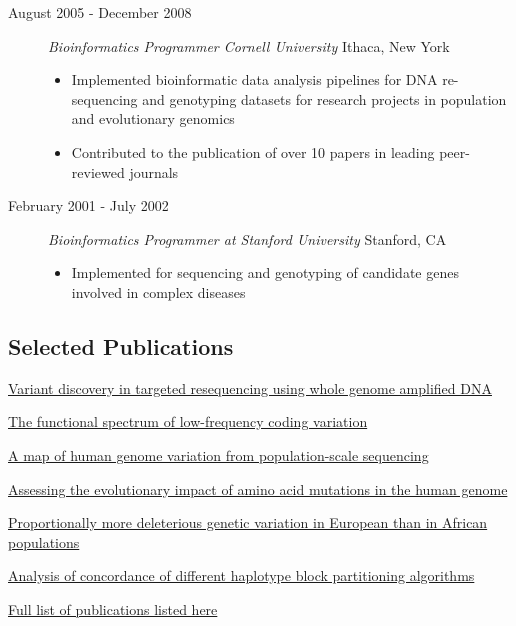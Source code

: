 \documentclass[]{article}
\begin{document}
\begin{description}
\item[August 2005 - December 2008]
\emph{Bioinformatics Programmer Cornell
University} Ithaca, New York

\begin{itemize}
	\item Implemented bioinformatic data analysis pipelines for DNA re-sequencing
and genotyping datasets for research projects in population and
evolutionary genomics 
	\item Contributed to the publication of over 10 papers in leading peer-reviewed journals
	\end{itemize}

\item[February 2001 - July 2002]
\emph{Bioinformatics Programmer at
Stanford University} Stanford, CA
\begin{itemize}
	\item Implemented for sequencing and genotyping of
candidate genes involved in complex diseases
\end{itemize}

\end{description}

\subsection{Selected Publications}\label{selected-publications}



\href{http://www.ncbi.nlm.nih.gov/pubmed/23837845}{Variant discovery in
targeted resequencing using whole genome amplified DNA}

\href{http://www.ncbi.nlm.nih.gov/pubmed/21917140}{The functional
spectrum of low-frequency coding variation}

\href{http://www.ncbi.nlm.nih.gov/pubmed/20981092}{A map of human genome
variation from population-scale sequencing}

\href{http://www.ncbi.nlm.nih.gov/pubmed/18516229}{Assessing the
evolutionary impact of amino acid mutations in the human genome}

\href{http://www.ncbi.nlm.nih.gov/pubmed/18288194}{Proportionally more
deleterious genetic variation in European than in African populations}

\href{http://www.ncbi.nlm.nih.gov/pubmed/16356172}{Analysis of
concordance of different haplotype block partitioning algorithms}

\href{http://orcid.org/0000-0002-3322-4735}{Full list of publications listed here}
\end{document}
